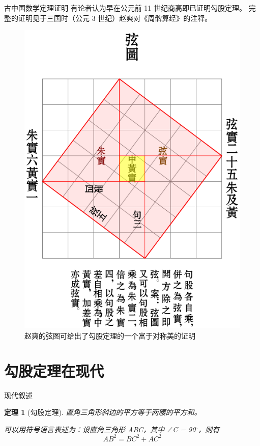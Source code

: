 \documentclass[xcolor=table]{beamer}
\newtheorem{thm}{定理}
\begin{document}
\begin{frame}{古中国数学}{定理证明}
有论者认为早在公元前 11 世纪商高即已证明勾股定理\cite{quanjing}。
完整的证明见于三国时（公元 3 世纪）赵爽对《周髀算经》的注释。
\begin{figure}
   \centering
   \includegraphics[scale=0.3]{res/xiantu.pdf}
   \caption{赵爽的弦图可给出了勾股定理的一个富于对称美的证明}
\end{figure}

\end{frame}


\section{勾股定理在现代}
\begin{frame}{现代叙述}
\begin{thm}[勾股定理]
直角三角形斜边的平方等于两腰的平方和。

可以用符号语言表述为：设直角三角形 ABC，其中 $\angle$C = 90$^\circ$，则有
\begin{equation}\label{eq:gougu}
AB^2=BC^2+AC^2
\end{equation}
\end{thm}
\begin{center}
\end{center}
\end{frame}
\end{document}
